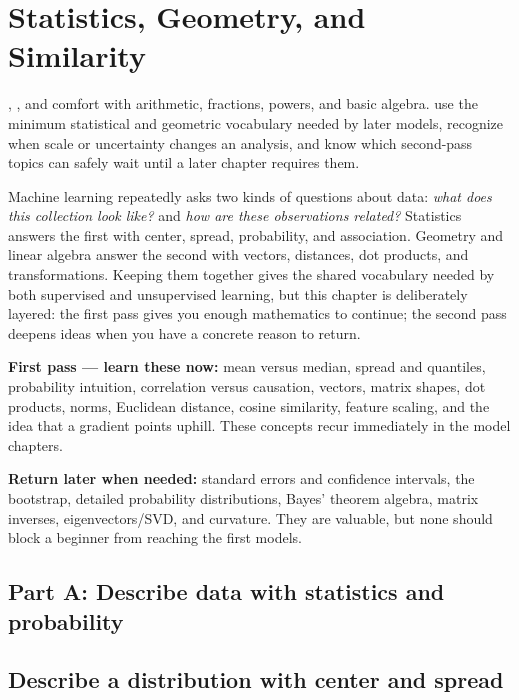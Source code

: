 \chapter{Statistics, Geometry, and Similarity}
\label{ch:foundations}
\label{ch:statistics}
\label{ch:linear-algebra}

\chapterguide%
  {, , and comfort with arithmetic, fractions, powers, and basic algebra.}
  {use the minimum statistical and geometric vocabulary needed by later models, recognize when scale or uncertainty changes an analysis, and know which second-pass topics can safely wait until a later chapter requires them.}

Machine learning repeatedly asks two kinds of questions about data: \emph{what does this collection look like?} and \emph{how are these observations related?} Statistics answers the first with center, spread, probability, and association. Geometry and linear algebra answer the second with vectors, distances, dot products, and transformations. Keeping them together gives the shared vocabulary needed by both supervised and unsupervised learning, but this chapter is deliberately layered: the first pass gives you enough mathematics to continue; the second pass deepens ideas when you have a concrete reason to return.

\begin{firstread}
\textbf{First pass --- learn these now:} mean versus median, spread and quantiles, probability intuition, correlation versus causation, vectors, matrix shapes, dot products, norms, Euclidean distance, cosine similarity, feature scaling, and the idea that a gradient points uphill. These concepts recur immediately in the model chapters.
\end{firstread}

\begin{secondpass}
\textbf{Return later when needed:} standard errors and confidence intervals, the bootstrap, detailed probability distributions, Bayes' theorem algebra, matrix inverses, eigenvectors/SVD, and curvature. They are valuable, but none should block a beginner from reaching the first models.
\end{secondpass}

\section*{Part A: Describe data with statistics and probability}
\section{Describe a distribution with center and spread}

